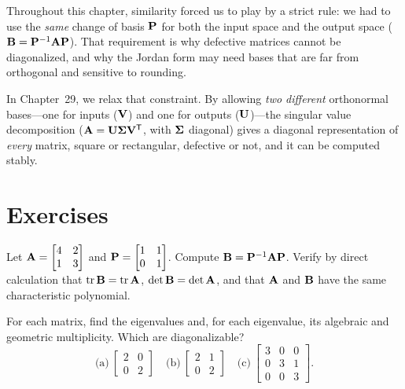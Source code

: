 Throughout this chapter, similarity forced us to play by a strict rule: we had to use the \emph{same} change of basis $\mathbf{P}$ for both the input space and the output space ($\mathbf{B} = \mathbf{P}^{-1}\mathbf{A}\mathbf{P}$). That requirement is why defective matrices cannot be diagonalized, and why the Jordan form may need bases that are far from orthogonal and sensitive to rounding.

In Chapter~29, we relax that constraint. By allowing \emph{two different} orthonormal bases---one for inputs ($\mathbf{V}$) and one for outputs ($\mathbf{U}$)---the singular value decomposition ($\mathbf{A} = \mathbf{U}\mathbf{\Sigma}\mathbf{V}^{\mathsf{T}}$, with $\mathbf{\Sigma}$ diagonal) gives a diagonal representation of \emph{every} matrix, square or rectangular, defective or not, and it can be computed stably.

\section{Exercises}
\label{ch28:exercises}

\begin{exercise}
\label{ch28:ex-invariants}
Let $\mathbf{A}=\begin{bmatrix}4&2\\1&3\end{bmatrix}$ and
$\mathbf{P}=\begin{bmatrix}1&1\\0&1\end{bmatrix}$. Compute $\mathbf{B}=\mathbf{P}^{-1}\mathbf{A}\mathbf{P}$.
Verify by direct calculation that $\operatorname{tr}\mathbf{B}=\operatorname{tr}\mathbf{A}$, $\det\mathbf{B}=\det\mathbf{A}$, and
that $\mathbf{A}$ and $\mathbf{B}$ have the same characteristic polynomial.
\end{exercise}

\begin{exercise}
\label{ch28:ex-mult}
For each matrix, find the eigenvalues and, for each eigenvalue, its algebraic and
geometric multiplicity. Which are diagonalizable?
\[
\text{(a)}\ \begin{bmatrix}2&0\\0&2\end{bmatrix}\quad
\text{(b)}\ \begin{bmatrix}2&1\\0&2\end{bmatrix}\quad
\text{(c)}\ \begin{bmatrix}3&0&0\\0&3&1\\0&0&3\end{bmatrix}.
\]
\end{exercise}

